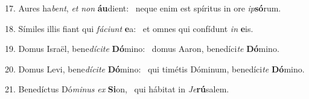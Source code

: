 17. Aures ha\textit{bent}, \textit{et} \textit{non} \textbf{áu}dient: \ast\  neque enim est spíritus in ore \textit{ip}\textbf{só}rum.\

18. Símiles illis fiant qui \textit{fá}\textit{ci}\textit{unt} \textbf{e}a: \ast\  et omnes qui confídunt \textit{in} \textbf{e}is.\

19. Domus Israël, bene\textit{dí}\textit{ci}\textit{te} \textbf{Dó}mino: \ast\  domus Aaron, benedíci\textit{te} \textbf{Dó}mino.\

20. Domus Levi, bene\textit{dí}\textit{ci}\textit{te} \textbf{Dó}mino: \ast\  qui timétis Dóminum, benedíci\textit{te} \textbf{Dó}mino.\

21. Benedíctus Dó\textit{mi}\textit{nus} \textit{ex} \textbf{Si}on, \ast\  qui hábitat in \textit{Je}\textbf{rú}salem.\

